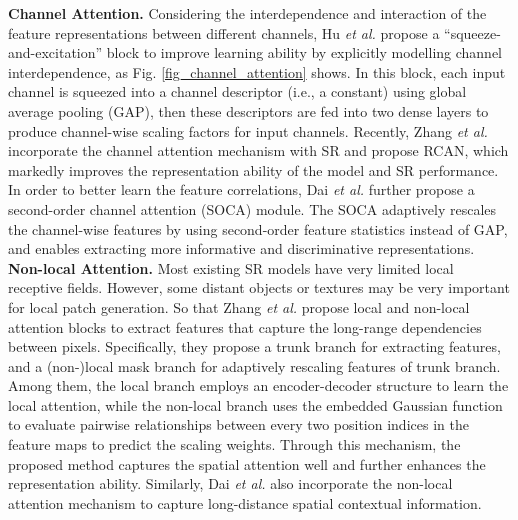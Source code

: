 {\label{sec_attention_mechanism}
\textbf{Channel Attention.}
Considering the interdependence and interaction of the feature representations between different channels, Hu \textit{et al.}  propose a ``squeeze-and-excitation'' block to improve learning ability by explicitly modelling channel interdependence, as Fig. \ref{fig_channel_attention} shows.
In this block, each input channel is squeezed into a channel descriptor (i.e., a constant) using global average pooling (GAP), then these descriptors are fed into two dense layers to produce channel-wise scaling factors for input channels.
Recently, Zhang \textit{et al.}  incorporate the channel attention mechanism with SR and propose RCAN, which markedly improves the representation ability of the model and SR performance.
In order to better learn the feature correlations, Dai \textit{et al.}  further propose a second-order channel attention (SOCA) module.
The SOCA adaptively rescales the channel-wise features by using second-order feature statistics instead of GAP, and enables extracting more informative and discriminative representations.
\textbf{Non-local Attention.}
Most existing SR models have very limited local receptive fields.
However, some distant objects or textures may be very important for local patch generation.
So that Zhang \textit{et al.}  propose local and non-local attention blocks to extract features that capture the long-range dependencies between pixels.
Specifically, they propose a trunk branch for extracting features, and a (non-)local mask branch for adaptively rescaling features of trunk branch.
Among them, the local branch employs an encoder-decoder structure to learn the local attention, while the non-local branch uses the embedded Gaussian function to evaluate pairwise relationships between every two position indices in the feature maps to predict the scaling weights.
Through this mechanism, the proposed method captures the spatial attention well and further enhances the representation ability.
Similarly, Dai \textit{et al.}  also incorporate the non-local attention mechanism to capture long-distance spatial contextual information.

}
